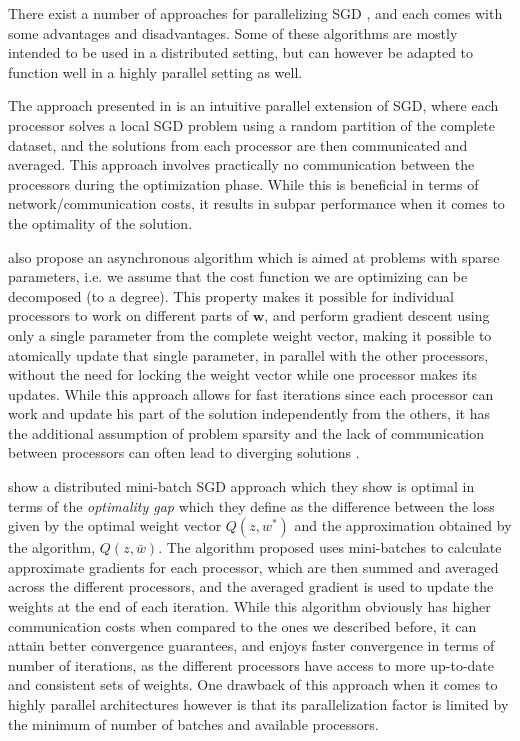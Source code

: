 \documentclass[11pt,a4paper]{article}
\newcommand{\Wb}{\mathbf{w}}
\begin{document}
There exist a number of approaches for parallelizing SGD \citep{zinkevich2010parallelized,
recht2011hogwild, dekel2012optimal}, and each comes with some advantages and disadvantages. Some of
these algorithms are mostly intended to be used in a distributed setting, but can however be
adapted to function well in a highly parallel setting as well.

The approach presented in \citep{zinkevich2010parallelized} is an intuitive parallel extension of
SGD, where each processor solves a local SGD problem using a random partition of the
complete dataset, and the solutions from each processor are then communicated and averaged. This
approach involves practically no communication between the processors during the optimization
phase. While this is beneficial in terms of network/communication costs, it results in subpar
performance when it comes to the optimality of the solution.

\cite{recht2011hogwild} also propose an asynchronous algorithm which is aimed at problems with
sparse parameters, i.e. we assume that the cost function we are optimizing can be decomposed (to a
degree). This property makes it possible for individual processors to work on different parts of
$\Wb$, and perform gradient descent using only a single parameter from the complete weight vector,
making it possible to atomically update that single parameter, in parallel with the other
processors, without the need for locking the weight vector while one processor makes its updates.
While this approach allows for fast iterations since each processor can work and update his part of
the solution independently from the others, it has the additional assumption of problem sparsity
and the lack of communication between processors can often lead to diverging solutions
\citep{dai2015analysis}.

\cite{dekel2012optimal} show a distributed mini-batch SGD approach which they show is optimal in
terms of the \textit{optimality gap} which they define as the difference between the loss given by
the optimal weight vector $Q(z, w^*)$ and the approximation obtained by the algorithm, $Q(z,
\bar{w})$. The algorithm proposed uses mini-batches to calculate approximate gradients for each
processor, which are then summed and averaged across the different processors, and the averaged
gradient is used to update the weights at the end of each iteration. While this algorithm obviously
has higher communication costs when compared to the ones we described before, it can attain better
convergence guarantees, and enjoys faster convergence in terms of number of iterations, as the
different processors have access to more up-to-date and consistent sets of weights. One drawback of
this approach when it comes to highly parallel architectures however is that its parallelization
factor is limited by the minimum of number of batches and available processors.
\end{document}
